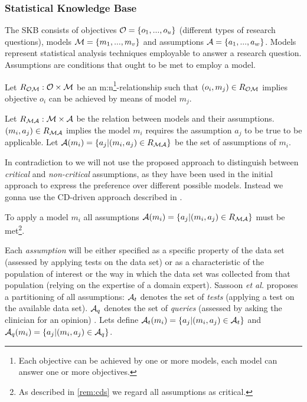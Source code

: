 \subsubsection{Statistical Knowledge Base}
\label{sub:SKB}

The \gls{SKB} consists of objectives $\mathcal{O}=\{o_1, ..., o_u\}$ (different types of research questions), models $\mathcal{M}=\{m_1, ..., m_v\}$ and assumptions $\mathcal{A} = \{a_1, ..., a_w\}$. Models represent statistical analysis techniques employable to answer a research question. Assumptions are conditions that ought to be met to employ a model.

\begin{definition}
	Let $R_{\mathcal{O}\mathcal{M}}: \mathcal{O} \times \mathcal{M}$ be an m:n\footnote{Each objective can be achieved by one or more models, each model can answer one or more objectives.}-relationship such that $(o_i, m_j)\in R_{\mathcal{O}\mathcal{M}}$ implies objective $o_i$ can be achieved by means of model $m_j$. 
\end{definition}

\begin{definition}
	Let $R_{\mathcal{M}\mathcal{A}}: \mathcal{M} \times \mathcal{A}$ be the relation between models and their assumptions. $(m_i, a_j)\in R_{\mathcal{M}\mathcal{A}}$ implies  the model $m_i$ requires the assumption $a_j$ to be true to be applicable. Let $\mathcal{A}(m_i) = \{a_j | (m_i, a_j) \in R_{\mathcal{M}\mathcal{A}}\}$ be the set of assumptions of $m_i$.
\end{definition}

\begin{remark}
In contradiction to \cite{sassoon2014} we will not use the proposed approach to distinguish between \textit{critical} and \textit{non-critical} assumptions, as they have been used in the initial approach to express the preference over different possible models. Instead we gonna use the \gls{CD}-driven approach described in \cite{sassoon2016CD}.
\label{rem:cds}
\end{remark}


\begin{definition}
To apply a model $m_i$ all assumptions $\mathcal{A}(m_i) = \{a_j | (m_i, a_j) \in R_{\mathcal{M}\mathcal{A}} \}$ must be met\footnote{As described in \cref{rem:cds} we regard all assumptions as critical.}.
\end{definition}

Each \textit{assumption} will be either specified as a specific property of the data set (assessed by applying tests on the data set) or as a characteristic of the population of interest or the way in which the data set was collected from that population (relying on the expertise of a domain expert). Sassoon \textit{et al.} proposes a partitioning of all assumptions: $\mathcal{A}_t$ denotes the set of \textit{tests} (applying a test on the available data set). $\mathcal{A}_q$ denotes the set of \textit{queries} (assessed by asking the clinician for an opinion) \cite{sassoon2014}. Lets define $\mathcal{A}_t(m_i)= \{a_j| (m_i, a_j) \in \mathcal{A}_t\}$ and $\mathcal{A}_q(m_i)= \{a_j| (m_i, a_j) \in \mathcal{A}_q\}$. 

